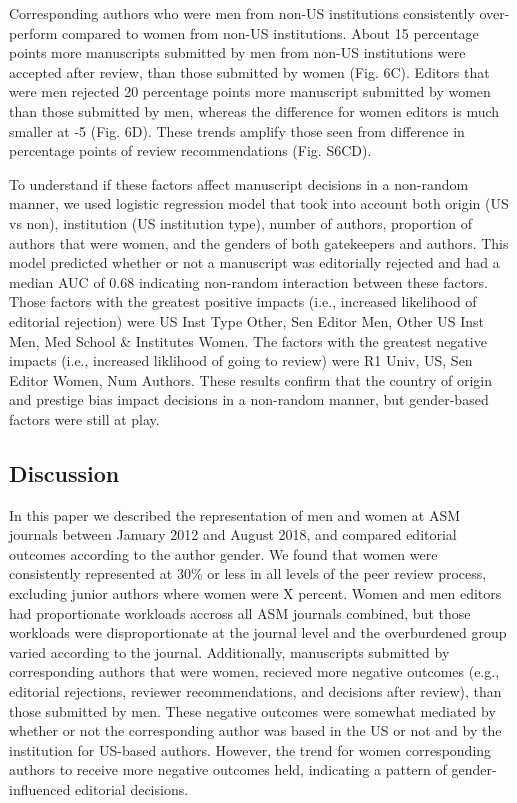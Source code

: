 \documentclass[11pt,]{article}
\begin{document}
Corresponding authors who were men from non-US institutions consistently
over-perform compared to women from non-US institutions. About 15
percentage points more manuscripts submitted by men from non-US
institutions were accepted after review, than those submitted by women
(Fig. 6C). Editors that were men rejected 20 percentage points more
manuscript submitted by women than those submitted by men, whereas the
difference for women editors is much smaller at -5 (Fig. 6D). These
trends amplify those seen from difference in percentage points of review
recommendations (Fig. S6CD).

To understand if these factors affect manuscript decisions in a
non-random manner, we used logistic regression model that took into
account both origin (US vs non), institution (US institution type),
number of authors, proportion of authors that were women, and the
genders of both gatekeepers and authors. This model predicted whether or
not a manuscript was editorially rejected and had a median AUC of 0.68
indicating non-random interaction between these factors. Those factors
with the greatest positive impacts (i.e., increased likelihood of
editorial rejection) were US Inst Type Other, Sen Editor Men, Other US
Inst Men, Med School \& Institutes Women. The factors with the greatest
negative impacts (i.e., increased liklihood of going to review) were R1
Univ, US, Sen Editor Women, Num Authors. These results confirm that the
country of origin and prestige bias impact decisions in a non-random
manner, but gender-based factors were still at play.

\subsection{Discussion}\label{discussion}

In this paper we described the representation of men and women at ASM
journals between January 2012 and August 2018, and compared editorial
outcomes according to the author gender. We found that women were
consistently represented at 30\% or less in all levels of the peer
review process, excluding junior authors where women were X percent.
Women and men editors had proportionate workloads accross all ASM
journals combined, but those workloads were disproportionate at the
journal level and the overburdened group varied according to the
journal. Additionally, manuscripts submitted by corresponding authors
that were women, recieved more negative outcomes (e.g., editorial
rejections, reviewer recommendations, and decisions after review), than
those submitted by men. These negative outcomes were somewhat mediated
by whether or not the corresponding author was based in the US or not
and by the institution for US-based authors. However, the trend for
women corresponding authors to receive more negative outcomes held,
indicating a pattern of gender-influenced editorial decisions.
\end{document}
